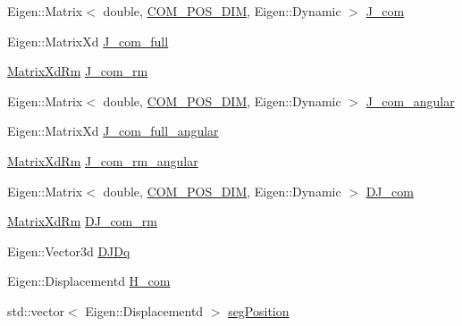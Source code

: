 \begin{DoxyCompactItemize}
\item 
\-Eigen\-::\-Matrix$<$ double, \*
\hyperlink{OcraWbiModel_8cpp_a72cb22de2538ae949cc73fa3d7c33bdc}{\-C\-O\-M\-\_\-\-P\-O\-S\-\_\-\-D\-I\-M}, \-Eigen\-::\-Dynamic $>$ \hyperlink{structOcraWbiModel_1_1OcraWbiModel__pimpl_ab724e92a7f74f03c3842f22129b2ad94}{\-J\-\_\-com}
\item 
\-Eigen\-::\-Matrix\-Xd \hyperlink{structOcraWbiModel_1_1OcraWbiModel__pimpl_a73c9391019a2e36ddd2c2f9ef1773a41}{\-J\-\_\-com\-\_\-full}
\item 
\hyperlink{namespaceocra__icub_aa5e36a19ed031c28ca83c207bd7dd83f}{\-Matrix\-Xd\-Rm} \hyperlink{structOcraWbiModel_1_1OcraWbiModel__pimpl_a58b26a33ee0449f71a3d338c23ea29d5}{\-J\-\_\-com\-\_\-rm}
\item 
\-Eigen\-::\-Matrix$<$ double, \*
\hyperlink{OcraWbiModel_8cpp_a72cb22de2538ae949cc73fa3d7c33bdc}{\-C\-O\-M\-\_\-\-P\-O\-S\-\_\-\-D\-I\-M}, \-Eigen\-::\-Dynamic $>$ \hyperlink{structOcraWbiModel_1_1OcraWbiModel__pimpl_a1755993b2e425c6a49c55874c6c455e4}{\-J\-\_\-com\-\_\-angular}
\item 
\-Eigen\-::\-Matrix\-Xd \hyperlink{structOcraWbiModel_1_1OcraWbiModel__pimpl_ac064807ab1c8a89585cb7aa5f49d8744}{\-J\-\_\-com\-\_\-full\-\_\-angular}
\item 
\hyperlink{namespaceocra__icub_aa5e36a19ed031c28ca83c207bd7dd83f}{\-Matrix\-Xd\-Rm} \hyperlink{structOcraWbiModel_1_1OcraWbiModel__pimpl_ad52987f0908ab1b44779e3d752a7b97b}{\-J\-\_\-com\-\_\-rm\-\_\-angular}
\item 
\-Eigen\-::\-Matrix$<$ double, \*
\hyperlink{OcraWbiModel_8cpp_a72cb22de2538ae949cc73fa3d7c33bdc}{\-C\-O\-M\-\_\-\-P\-O\-S\-\_\-\-D\-I\-M}, \-Eigen\-::\-Dynamic $>$ \hyperlink{structOcraWbiModel_1_1OcraWbiModel__pimpl_a38a8628ca93524e08beada55f455249b}{\-D\-J\-\_\-com}
\item 
\hyperlink{namespaceocra__icub_aa5e36a19ed031c28ca83c207bd7dd83f}{\-Matrix\-Xd\-Rm} \hyperlink{structOcraWbiModel_1_1OcraWbiModel__pimpl_a864b4ce170b3526fba0f7e832bfbb2d8}{\-D\-J\-\_\-com\-\_\-rm}
\item 
\-Eigen\-::\-Vector3d \hyperlink{structOcraWbiModel_1_1OcraWbiModel__pimpl_accd197872291c3e90272b8ebd87cefc8}{\-D\-J\-Dq}
\item 
\-Eigen\-::\-Displacementd \hyperlink{structOcraWbiModel_1_1OcraWbiModel__pimpl_a5e031088136b048a403c9df06e62c2b8}{\-H\-\_\-com}
\item 
std\-::vector$<$ \-Eigen\-::\-Displacementd $>$ \hyperlink{structOcraWbiModel_1_1OcraWbiModel__pimpl_a47b0a577b990fa7db3bc04a7a8107c31}{seg\-Position}

\end{DoxyCompactItemize}
